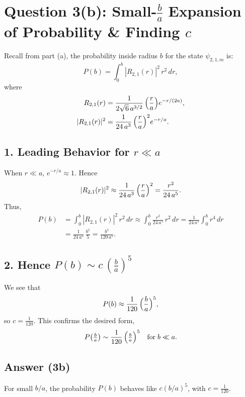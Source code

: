 \documentclass[12pt]{article}
\begin{document}
\section*{Question 3(b): Small-$\frac{b}{a}$ Expansion of Probability \& Finding $c$}

Recall from part (a), the probability inside radius $b$ for the state $\psi_{2,1,m}$ is:
\begin{equation}
P(b) = \int_0^b |R_{2,1}(r)|^2 \, r^2 \,dr,
\end{equation}
where
\begin{align*}
R_{2,1}(r) &= \frac{1}{2\sqrt{6}\,a^{3/2}}\,\Bigl(\frac{r}{a}\Bigr) e^{-r/(2a)},\\
|R_{2,1}(r)|^2 &= \frac{1}{24\,a^3}\,\Bigl(\frac{r}{a}\Bigr)^2 e^{-r/a}.
\end{align*}

\subsection*{1. Leading Behavior for $r \ll a$}
When $r\ll a$, $e^{-r/a}\approx 1$. Hence
\begin{equation}
|R_{2,1}(r)|^2 \approx \frac{1}{24\,a^3}\,\Bigl(\frac{r}{a}\Bigr)^2
= \frac{r^2}{24\,a^5}.
\end{equation}
Thus,
\begin{align*}
P(b) &= \int_0^b |R_{2,1}(r)|^2 \, r^2\,dr \approx \int_0^b \frac{r^2}{24\,a^5}\,r^2\,dr
= \frac{1}{24\,a^5} \int_0^b r^4\,dr \\[6pt]
&= \frac{1}{24\,a^5}\,\frac{b^5}{5} = \frac{b^5}{120\,a^5}.
\end{align*}

\subsection*{2. Hence $P(b) \sim c\,(\tfrac{b}{a})^5$}
We see that
\begin{equation}
P(b) \approx \frac{1}{120}\,\Bigl(\frac{b}{a}\Bigr)^5,
\end{equation}
so $c=\tfrac{1}{120}$. This confirms the desired form,
\begin{equation}
P\bigl(\tfrac{b}{a}\bigr) \sim \frac{1}{120}\,\Bigl(\tfrac{b}{a}\Bigr)^5\quad\text{for}\; b\ll a.
\end{equation}

\subsection*{Answer (3b)}
For small $b/a$, the probability $P(b)$ behaves like $c (b/a)^5$, with $c = \tfrac{1}{120}$.\newline
\end{document}
